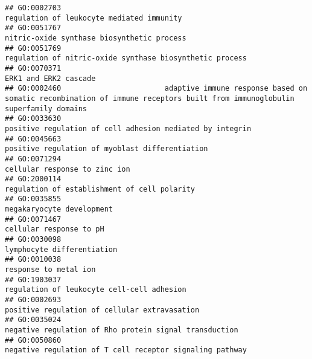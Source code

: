 \documentclass[
]{article}
\begin{document}
\begin{verbatim}
## GO:0002703                                                                                                        regulation of leukocyte mediated immunity
## GO:0051767                                                                                                       nitric-oxide synthase biosynthetic process
## GO:0051769                                                                                         regulation of nitric-oxide synthase biosynthetic process
## GO:0070371                                                                                                                            ERK1 and ERK2 cascade
## GO:0002460                        adaptive immune response based on somatic recombination of immune receptors built from immunoglobulin superfamily domains
## GO:0033630                                                                                        positive regulation of cell adhesion mediated by integrin
## GO:0045663                                                                                                  positive regulation of myoblast differentiation
## GO:0071294                                                                                                                    cellular response to zinc ion
## GO:2000114                                                                                                     regulation of establishment of cell polarity
## GO:0035855                                                                                                                        megakaryocyte development
## GO:0071467                                                                                                                          cellular response to pH
## GO:0030098                                                                                                                       lymphocyte differentiation
## GO:0010038                                                                                                                            response to metal ion
## GO:1903037                                                                                                       regulation of leukocyte cell-cell adhesion
## GO:0002693                                                                                                    positive regulation of cellular extravasation
## GO:0035024                                                                                           negative regulation of Rho protein signal transduction
## GO:0050860                                                                                         negative regulation of T cell receptor signaling pathway

\end{verbatim}
\end{document}
